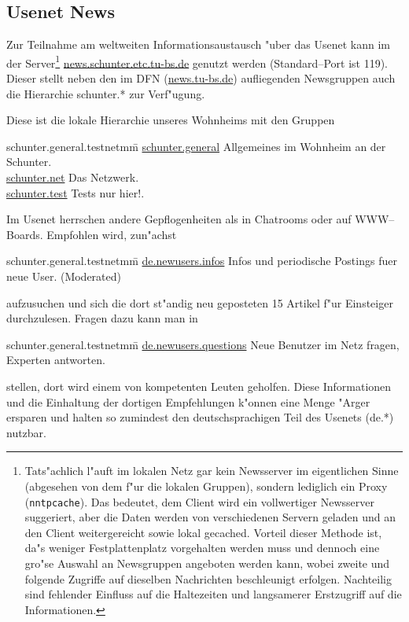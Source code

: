 \subsection{Usenet News}

Zur Teilnahme am weltweiten Informationsaustausch "uber das \glossar Usenet
kann im \snev der \glossar Server\footnote{Tats"achlich l"auft im lokalen
  Netz gar kein Newsserver im eigentlichen Sinne (abgesehen von dem f"ur die
  lokalen Gruppen), sondern lediglich ein \glossar Proxy
  (\texttt{nntpcache}). Das bedeutet, dem \glossar Client wird ein
  vollwertiger Newsserver suggeriert, aber die Daten werden von verschiedenen
  \glossar Servern geladen und an den Client weitergereicht sowie lokal
  gecached. Vorteil dieser Methode ist, da"s weniger Festplattenplatz
  vorgehalten werden muss und dennoch eine gro"se Auswahl an Newsgruppen
  angeboten werden kann, wobei zweite und folgende Zugriffe auf dieselben
  Nachrichten beschleunigt erfolgen. Nachteilig sind fehlender Einfluss auf
  die Haltezeiten und langsamerer Erstzugriff auf die Informationen.}
\url{news.schunter.etc.tu-bs.de} genutzt werden (Standard--Port ist 119).
Dieser stellt neben den im DFN (\url{news.tu-bs.de}) aufliegenden
Newsgruppen auch die Hierarchie %
schunter.* zur Verf"ugung.

Diese ist die lokale Hierarchie unseres Wohnheims mit den Gruppen 
\begin{tabbing}
  schunter.general.testnetmm\=\kill
  \url{schunter.general} \> Allgemeines im Wohnheim an der Schunter. \\
  \url{schunter.net} \> Das Netzwerk. \\
  \url{schunter.test} \> Tests nur hier!. 
\end{tabbing}

Im Usenet herrschen andere Gepflogenheiten als in Chatrooms oder auf
WWW--Boards. Empfohlen wird, zun"achst 
\begin{tabbing}
  schunter.general.testnetmm\=\kill
  \url{de.newusers.infos} \> Infos und periodische Postings fuer neue User. (Moderated)
\end{tabbing}
aufzusuchen und sich die dort st"andig neu geposteten 15 Artikel f"ur
Einsteiger durchzulesen. Fragen dazu kann man in
\begin{tabbing}
  schunter.general.testnetmm\=\kill
  \url{de.newusers.questions} \> Neue Benutzer im Netz fragen, Experten antworten.
\end{tabbing}
stellen, dort wird einem von kompetenten Leuten geholfen. Diese Informationen
und die Einhaltung der dortigen Empfehlungen k"onnen eine Menge "Arger
ersparen und halten so zumindest den deutschsprachigen Teil des Usenets (de.*)
nutzbar.

